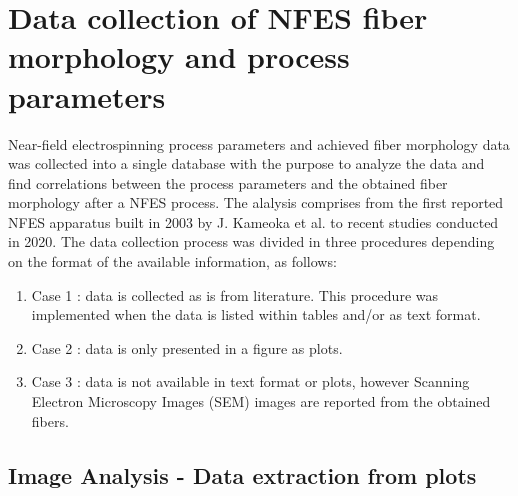\section{Data collection of NFES fiber morphology and process parameters}

Near-field electrospinning process parameters and achieved fiber morphology data was collected into a single database with the purpose to analyze the data and find correlations between the process parameters and the obtained fiber morphology after a NFES process. The alalysis comprises from the first reported NFES apparatus built in 2003 by J. Kameoka et al. \cite{Kameoka2003a} to recent studies conducted in 2020. \cite{
  Yang2019,Fattahi2017,Shin2019,Wang2015,Parajuli2016,Zheng2010,Fuh2011,Dalton2015,
  Ru2014,Xue2014,Wang2017,Xu2014,Liu2013,Pan2014,Canton2014,Chakraborty2009,Gupta2007,
  He2018,Zhou2011,Chen2013,Williams2018,Choi2017,Pan2019,Lei2015,Lim2019,Park2020,
  Fuh2012,Flores2017,Chang2010,Xu2019,Zhang2019,Shin2018,Fuh2015,Nagle2019,Zheng2012,
  Kameoka2003a,Liu2014,E.King2019,Hochleitner2017,Madou2011,Jiang2018,Husain2016,
  ElectrospinTech2015,Brown2011,Kolan2018,Chang2011,Beachley2011,Camillo2013,Kameoka2003,
  Bu2012,Lee2012,Huang2015,Coppola2020,CisquellaSerra2019,Ruggieri2013,Hochleitner2014,
  Zhu2016,Brown2014,Chang2008,Sonntag2020,Kim2018,Deng2020,Han2019,George2020,Sun2006a,
  Pan2015,Shen2016,Strauss2019,Fuh2013,Sarkar2007,You2017,Wang2018a,Zheng2014,Song2015,
  GaofengZheng2010,Liu2015a,Min2013,Luo2016,Yousefi2019,Cardenas2017,Coppola2014} The data collection process was divided in three procedures depending on the format of the available information, as follows:

\begin{enumerate}
\item Case 1 : data is collected as is from literature. This procedure was implemented when the data is listed within tables and/or as text format.
\item Case 2 : data is only presented in a figure as plots.
\item Case 3 : data is not available in text format or plots, however Scanning Electron Microscopy Images (SEM) images are reported from the obtained fibers.
\end{enumerate}

\subsection{Image Analysis - Data extraction from plots}

